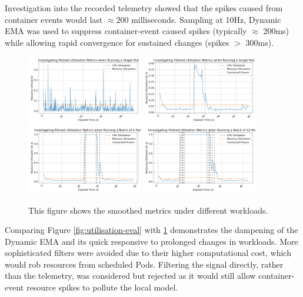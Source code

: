 Investigation into the recorded telemetry showed that the spikes caused from
container events would last $\approx$200 milliseconds. Sampling at
10Hz, Dynamic EMA was used to suppress container-event caused spikes (typically
$\approx$ 200ms) while allowing rapid convergence for sustained changes (spikes
$>$ 300ms).

\begin{figure}[H]
    \centering
    \includegraphics[width=0.45\textwidth]{images/filter-utilisation-baseline.png}
    \includegraphics[width=0.45\textwidth]{images/filter-utilisation-single.png} \\
    \includegraphics[width=0.45\textwidth]{images/filter-utilisation-smallbatch.png}
    \includegraphics[width=0.45\textwidth]{images/filter-utilisation-bigbatch.png}
    \caption{This figure shows the smoothed metrics under different workloads.}
    \label{fig:filtered-metrics-eval}
\end{figure}

Comparing Figure \ref{fig:utilisation-eval} with \ref{fig:filtered-metrics-eval}
demonstrates the dampening of the Dynamic EMA and its quick responsive to
prolonged changes in workloads. More sophisticated filters were avoided due to
their higher computational cost, which would rob resources from scheduled Pods.
Filtering the signal directly, rather than the telemetry, was considered but
rejected as it would still allow container-event resource spikes to pollute the
local model.

